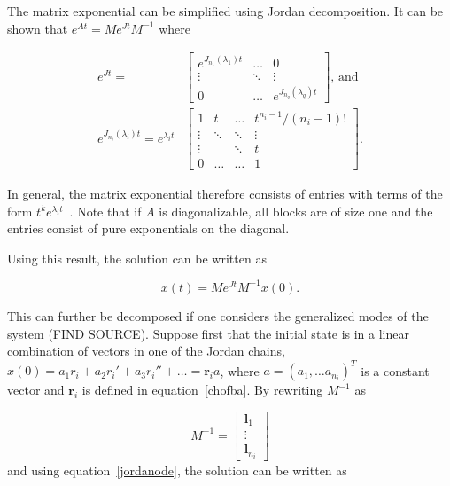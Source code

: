 \documentclass[../main.tex]{subfiles}
\begin{document}
The matrix exponential can be simplified using Jordan decomposition. It can be shown that  $e^{At} = Me^{Jt}M^{-1}$ where 

\begin{equation}\label{eq:expjordan}
    \begin{aligned}
        e^{Jt} = &\begin{bmatrix}e^{J_{n_1}(\lambda_1)t} & \dots & 0 \\
                                                         \vdots & \ddots & \vdots \\
                                                         0 & \dots &  e^{J_{n_q}(\lambda_q)t}\end{bmatrix} \text{, and } \\
            e^{J_{n_i}(\lambda_i)t} = e^{\lambda_it} &\begin{bmatrix} 1 & t & \dots & t^{n_i-1}/(n_i-1)! \\
                                                                \vdots  & \ddots & \ddots & \vdots \\
                                                                \vdots & & \ddots& t \\
                                                            0 & \dots & \dots & 1\ \end{bmatrix}.
    \end{aligned}
\end{equation}

In general, the matrix exponential therefore consists of entries with terms of the form $t^ke^{\lambda_it}$~\cite{uffe}. Note that if $A$ is diagonalizable, all blocks are of size one and the entries consist of pure exponentials on the diagonal. 

Using this result, the solution can be written as 

\begin{equation}\label{jordanode}
    x(t) = Me^{Jt}M^{-1}x(0).
\end{equation}

This can further be decomposed if one considers the generalized modes of the system (FIND SOURCE). Suppose first that the initial state is in a linear combination of vectors in one of the Jordan chains, $x(0) = a_1r_i + a_2r_i' + a_3r_i'' + \dots = \boldsymbol{r}_ia$, where $a = (a_1, \dots a_{n_i})^T$ is a constant vector and $\boldsymbol{r}_i$ is defined in equation~\eqref{chofba}. By rewriting $M^{-1}$ as

\begin{equation}
    M^{-1} = \begin{bmatrix} \boldsymbol{l}_1 \\ \vdots \\ \boldsymbol{l}_{n_i} \end{bmatrix}
\end{equation}
and using equation~\eqref{jordanode}, the solution can be written as
\end{document}
